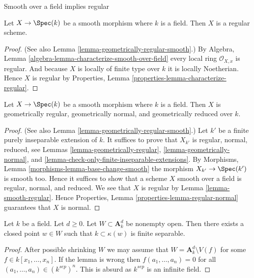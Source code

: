 \begin{lemma}
\label{lemma-smooth-regular}
\begin{slogan}
Smooth over a field implies regular
\end{slogan}
Let $X \to \Spec(k)$ be a smooth morphism where $k$ is a field.
Then $X$ is a regular scheme.
\end{lemma}

\begin{proof}
(See also
Lemma \ref{lemma-geometrically-regular-smooth}.)
By
Algebra, Lemma \ref{algebra-lemma-characterize-smooth-over-field}
every local ring $\mathcal{O}_{X, x}$ is regular.
And because $X$ is locally of finite type over $k$ it is locally
Noetherian. Hence $X$ is regular by
Properties, Lemma \ref{properties-lemma-characterize-regular}.
\end{proof}

\begin{lemma}
\label{lemma-smooth-geometrically-normal}
Let $X \to \Spec(k)$ be a smooth morphism where $k$ is a field.
Then $X$ is geometrically regular, geometrically normal, and
geometrically reduced over $k$.
\end{lemma}

\begin{proof}
(See also
Lemma \ref{lemma-geometrically-regular-smooth}.)
Let $k'$ be a finite purely inseparable extension of $k$.
It suffices to prove that $X_{k'}$ is regular, normal, reduced, see
Lemmas \ref{lemma-geometrically-regular},
\ref{lemma-geometrically-normal}, and
\ref{lemma-check-only-finite-inseparable-extensions}.
By
Morphisms, Lemma \ref{morphisms-lemma-base-change-smooth}
the morphism $X_{k'} \to \Spec(k')$ is smooth too.
Hence it suffices to show that a scheme $X$ smooth over a field is regular,
normal, and reduced. We see that $X$ is regular by
Lemma \ref{lemma-smooth-regular}.
Hence
Properties, Lemma \ref{properties-lemma-regular-normal}
guarantees that $X$ is normal.
\end{proof}

\begin{lemma}
\label{lemma-affine-space-over-field}
Let $k$ be a field. Let $d \geq 0$. Let $W \subset \mathbf{A}^d_k$
be nonempty open. Then there exists a closed point $w \in W$ such that
$k \subset \kappa(w)$ is finite separable.
\end{lemma}

\begin{proof}
After possible shrinking $W$ we may assume that
$W = \mathbf{A}^d_k \setminus V(f)$ for some $f \in k[x_1, \ldots, x_n]$.
If the lemma is wrong then $f(a_1, \ldots, a_n) = 0$ for all
$(a_1, \ldots, a_n) \in (k^{sep})^n$. This is absurd as $k^{sep}$
is an infinite field.
\end{proof}

